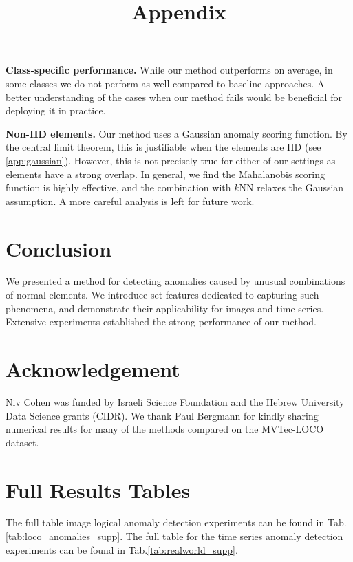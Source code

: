 \documentclass{article}
\begin{document}
\textbf{Class-specific performance.} While our method outperforms on average, in some classes we do not perform as well compared to baseline approaches. A better understanding of the cases when our method fails would be beneficial for deploying it in practice.

\textbf{Non-IID elements.} Our method uses a Gaussian anomaly scoring function. By the central limit theorem, this is justifiable when the elements are IID (see \cref{app:gaussian}). However, this is not precisely true for either of our settings as elements have a strong overlap. In general, we find the Mahalanobis scoring function is highly effective, and the combination with $k$NN relaxes the Gaussian assumption. A more careful analysis is left for future work.

\section{Conclusion}

We presented a method for detecting anomalies caused by unusual combinations of normal elements. We introduce set features dedicated to capturing such phenomena, and demonstrate their applicability for images and time series. Extensive experiments established the strong performance of our method.

\section{Acknowledgement}
Niv Cohen was funded by Israeli Science Foundation and the Hebrew University Data Science grants (CIDR). We thank Paul Bergmann for kindly sharing numerical results for many of the methods compared on the MVTec-LOCO dataset. 






\clearpage

\appendix

 \title{Appendix}

\section{Full Results Tables}
\label{app:full_results}
The full table image logical anomaly detection experiments can be found in Tab.\ref{tab:loco_anomalies_supp}.
The full table for the time series anomaly detection experiments can be found in Tab.\ref{tab:realworld_supp}.
\end{document}
